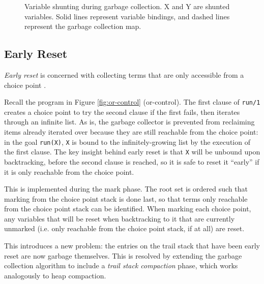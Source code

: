 \begin{enumerate}
\begin{figure}[H]
\caption{Variable shunting during garbage collection. X and Y are shunted variables. Solid lines represent variable bindings, and dashed lines represent the garbage collection map.}
\label{fig:shunt-cases}
\end{figure}

\end{enumerate}

\subsection{Early Reset}

\emph{Early reset} is concerned with collecting terms that are only accessible from a choice point \cite{applebyGarbargecollectionProlog1988}.

Recall the program in Figure \ref{fig:or-control} (or-control). The first clause of \texttt{run/1} creates a choice point to try the second clause if the first fails, then iterates through an infinite list. As is, the garbage collector is prevented from reclaiming items already iterated over because they are still reachable from the choice point: in the goal \texttt{run(X)}, \texttt{X} is bound to the infinitely-growing list by the execution of the first clause. The key insight behind early reset is that \texttt{X} will be unbound upon backtracking, before the second clause is reached, so it is safe to reset it ``early'' if it is only reachable from the choice point.

This is implemented during the mark phase. The root set is ordered such that marking from the choice point stack is done last, so that terms only reachable from the choice point stack can be identified. When marking each choice point, any variables that will be reset when backtracking to it that are currently unmarked (i.e. only reachable from the choice point stack, if at all) are reset.

This introduces a new problem: the entries on the trail stack that have been early reset are now garbage themselves. This is resolved by extending the garbage collection algorithm to include a \emph{trail stack compaction} phase, which works analogously to heap compaction.

